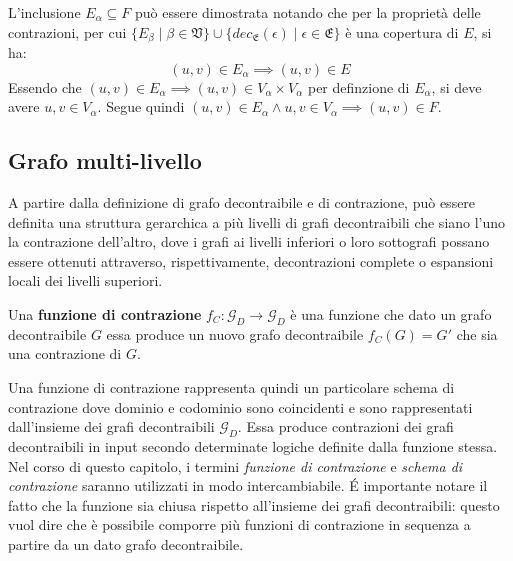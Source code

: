 L'inclusione $E_\alpha \subseteq F$ pu\`o essere dimostrata notando che per la propriet\`a delle contrazioni,
per cui $\{ E_\beta \mid \beta \in \mathfrak{V}\} \cup
\{dec_{\mathfrak{E}}(\epsilon) \mid \epsilon \in \mathfrak{E}\} $ \`e una copertura di $E$, si ha:
\begin{equation*}
    (u, v) \in E_\alpha \implies (u, v) \in E
\end{equation*}
Essendo che  $(u, v) \in E_\alpha \implies (u, v) \in V_\alpha \times V_\alpha$ per definzione di $E_\alpha$, si
deve avere $u, v \in V_\alpha$. Segue quindi $(u, v) \in E_\alpha \land u,v \in V_\alpha \implies (u, v) \in F$.

\newpage

\subsection{Grafo multi-livello}\label{subsec:grafo-multi-livello}

A partire dalla definizione di grafo decontraibile e di contrazione, pu\`o essere definita una struttura gerarchica
a pi\`u livelli di grafi decontraibili che siano l'uno la contrazione dell'altro, dove i grafi ai livelli inferiori
o loro sottografi possano essere ottenuti attraverso, rispettivamente, decontrazioni complete o espansioni locali
dei livelli superiori.


\begin{definition} 
Una \textbf{funzione di contrazione} $f_C : \mathcal{G}_D \rightarrow \mathcal{G}_D$ \`e una funzione che dato un
grafo decontraibile $G$ essa produce un nuovo grafo decontraibile $f_C(G) = G'$ che sia una contrazione di $G$.
\end{definition}

Una funzione di contrazione rappresenta quindi un particolare schema di contrazione dove dominio e codominio sono
coincidenti e sono rappresentati dall'insieme dei grafi decontraibili $\mathcal{G}_D$. Essa produce contrazioni
dei grafi decontraibili in input secondo determinate logiche definite dalla funzione stessa.
Nel corso di questo capitolo, i termini \textit{funzione di contrazione} e \textit{schema di contrazione}
saranno utilizzati in modo intercambiabile. \newline
\'E importante notare il fatto che la funzione sia chiusa rispetto all'insieme dei grafi decontraibili: questo vuol
dire che \`e possibile comporre pi\`u funzioni di contrazione in sequenza a partire da un dato grafo decontraibile.
\newline

